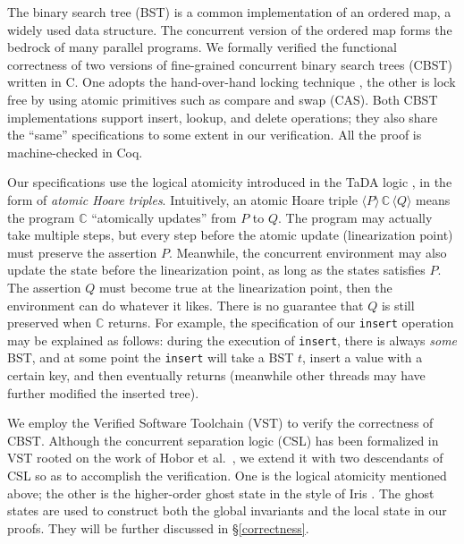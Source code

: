 

The binary search tree (BST) is a common implementation of an ordered
map, a widely used data structure. The concurrent version of the
ordered map forms the bedrock of many parallel programs. We formally
verified the functional correctness of two versions of fine-grained
concurrent binary search trees (CBST) written in C. One adopts the
hand-over-hand locking technique \cite{bayer1977}, the other is lock
free by using atomic primitives such as compare and swap (CAS). Both
CBST implementations support insert, lookup, and delete operations; %
they also share the ``same'' specifications to some extent in our
verification. All the proof is machine-checked in Coq. %

Our specifications use the logical atomicity introduced in the TaDA
logic \cite{tada}, in the form of \emph{atomic Hoare
triples}. Intuitively, an atomic Hoare triple $ \langle
P \rangle\,\mathbb{C}\, \langle Q \rangle$ means the program
$\mathbb{C}$ ``atomically updates'' from $P$ to $Q$. The program may
actually take multiple steps, but every step before the atomic update
(linearization point) must preserve the assertion $P$. Meanwhile, the
concurrent environment may also update the state before the
linearization point, as long as the states satisfies $P$. The
assertion $Q$ must become true at the linearization point, then the
environment can do whatever it likes. There is no guarantee that $Q$
is still preserved when $\mathbb{C}$ returns. For example, the
specification of our \texttt{insert} operation may be explained as
follows: during the execution of \texttt{insert}, there is
always \emph{some} BST, and at some point the \texttt{insert} will
take a BST $t$, insert a value with a certain key, and then eventually
returns (meanwhile other threads may have further modified the
inserted tree).

We employ the Verified Software Toolchain (VST) \cite{plfcc} to verify
the correctness of CBST. Although the concurrent separation logic
(CSL) has been formalized in VST rooted on the work of Hobor et
al.\ \cite{oraclesematic}, we extend it with two descendants of CSL so
as to accomplish the verification. One is the logical atomicity
mentioned above; the other is the higher-order ghost state in the
style of Iris \cite{higherorderghoststate}. The ghost states are used
to construct both the global invariants and the local state in our
proofs. They will be further discussed in \S\ref{correctness}.

